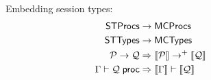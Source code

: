 \begin{figure}[h!]
  Embedding session types:
    \begin{align*}
      \mathsf{STProcs} &\rightarrow \mathsf{MCProcs}\\
      \mathsf{STTypes} &\rightarrow \mathsf{MCTypes}\\
      \mathcal{P} \rightarrow \mathcal{Q} &\Rightarrow
        \llbracket {\mathcal{P}} \rrbracket \rightarrow^+ \llbracket {\mathcal{Q}} \rrbracket\\
      {\Gamma} \vdash {\mathcal{Q} \;\mathsf{proc}} &\Rightarrow
         { \llbracket {\Gamma} \rrbracket} \vdash { \llbracket {\mathcal{Q}} \rrbracket}
    \end{align*}
\end{figure}
 

